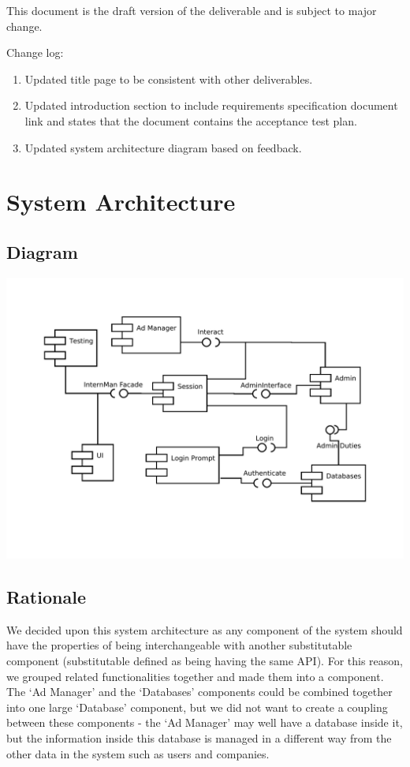 \documentclass[11pt]{l3deliverable}
\begin{document}
This document is the draft version of the deliverable and is subject to major
change.

Change log:

\begin{enumerate}
\item Updated title page to be consistent with other deliverables.
\item Updated introduction section to include requirements specification document
link and states that the document contains the acceptance test plan.
\item Updated system architecture diagram based on feedback.
\end{enumerate}

\newpage

\section{System Architecture}

\subsection{Diagram}

\begin{centering}
  \includegraphics[width=\textwidth]{PSDDiagram.pdf}
\end{centering}

\subsection{Rationale}

We decided upon this system architecture as any component of the system should 
have the properties of being interchangeable with another substitutable 
component (substitutable defined as being having the same API). For this reason, 
we grouped related functionalities together and made them into a component. 
The `Ad Manager' and the `Databases' components could be combined together 
into one large `Database' component, but we did not want to create a coupling 
between these components - the `Ad Manager' may well have a database inside 
it, but the information inside this database is managed in a different way from 
the other data in the system such as users and companies.
\end{document}
